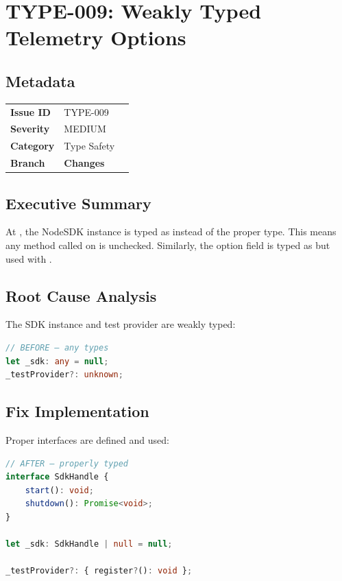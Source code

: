 \section{TYPE-009: Weakly Typed Telemetry Options}
\label{sec:type-009}
\subsection*{Metadata}
\begin{tabular}{ll}
\textbf{Issue ID} & TYPE-009 \\
\textbf{Severity} & MEDIUM \\
\textbf{Category} & Type Safety \\
\textbf{Branch} & 
\textbf{Changes} &  \\
\end{tabular}

\subsection*{Executive Summary}
At , the NodeSDK instance is typed as  instead of the proper type. This means any method called on  is unchecked. Similarly, the  option field is typed as  but used with .

\subsection*{Root Cause Analysis}
The SDK instance and test provider are weakly typed:

\begin{lstlisting}[language=TypeScript]
// BEFORE — any types
let _sdk: any = null;
_testProvider?: unknown;
\end{lstlisting}

\subsection*{Fix Implementation}
Proper interfaces are defined and used:

\begin{lstlisting}[language=TypeScript]
// AFTER — properly typed
interface SdkHandle {
    start(): void;
    shutdown(): Promise<void>;
}

let _sdk: SdkHandle | null = null;

_testProvider?: { register?(): void };
\end{lstlisting}

